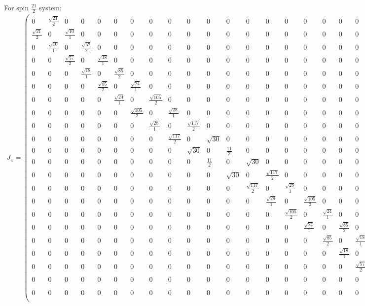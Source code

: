 \documentclass[10pt,a4paper]{article}
\begin{document}
For spin $\frac{21}{2}$ system:\begin{align}
J_x = \begin{pmatrix}
0&\frac{\sqrt{21}}{2}&0&0&0&0&0&0&0&0&0&0&0&0&0&0&0&0&0&0&0&0&\\\frac{\sqrt{21}}{2}&0&\frac{\sqrt{10}}{1}&0&0&0&0&0&0&0&0&0&0&0&0&0&0&0&0&0&0&0&\\0&\frac{\sqrt{10}}{1}&0&\frac{\sqrt{57}}{2}&0&0&0&0&0&0&0&0&0&0&0&0&0&0&0&0&0&0&\\0&0&\frac{\sqrt{57}}{2}&0&\frac{\sqrt{18}}{1}&0&0&0&0&0&0&0&0&0&0&0&0&0&0&0&0&0&\\0&0&0&\frac{\sqrt{18}}{1}&0&\frac{\sqrt{85}}{2}&0&0&0&0&0&0&0&0&0&0&0&0&0&0&0&0&\\0&0&0&0&\frac{\sqrt{85}}{2}&0&\frac{\sqrt{24}}{1}&0&0&0&0&0&0&0&0&0&0&0&0&0&0&0&\\0&0&0&0&0&\frac{\sqrt{24}}{1}&0&\frac{\sqrt{105}}{2}&0&0&0&0&0&0&0&0&0&0&0&0&0&0&\\0&0&0&0&0&0&\frac{\sqrt{105}}{2}&0&\frac{\sqrt{28}}{1}&0&0&0&0&0&0&0&0&0&0&0&0&0&\\0&0&0&0&0&0&0&\frac{\sqrt{28}}{1}&0&\frac{\sqrt{117}}{2}&0&0&0&0&0&0&0&0&0&0&0&0&\\0&0&0&0&0&0&0&0&\frac{\sqrt{117}}{2}&0&\sqrt{30}&0&0&0&0&0&0&0&0&0&0&0&\\0&0&0&0&0&0&0&0&0&\sqrt{30}&0&\frac{11}{2}&0&0&0&0&0&0&0&0&0&0&\\0&0&0&0&0&0&0&0&0&0&\frac{11}{2}&0&\sqrt{30}&0&0&0&0&0&0&0&0&0&\\0&0&0&0&0&0&0&0&0&0&0&\sqrt{30}&0&\frac{\sqrt{117}}{2}&0&0&0&0&0&0&0&0&\\0&0&0&0&0&0&0&0&0&0&0&0&\frac{\sqrt{117}}{2}&0&\frac{\sqrt{28}}{1}&0&0&0&0&0&0&0&\\0&0&0&0&0&0&0&0&0&0&0&0&0&\frac{\sqrt{28}}{1}&0&\frac{\sqrt{105}}{2}&0&0&0&0&0&0&\\0&0&0&0&0&0&0&0&0&0&0&0&0&0&\frac{\sqrt{105}}{2}&0&\frac{\sqrt{24}}{1}&0&0&0&0&0&\\0&0&0&0&0&0&0&0&0&0&0&0&0&0&0&\frac{\sqrt{24}}{1}&0&\frac{\sqrt{85}}{2}&0&0&0&0&\\0&0&0&0&0&0&0&0&0&0&0&0&0&0&0&0&\frac{\sqrt{85}}{2}&0&\frac{\sqrt{18}}{1}&0&0&0&\\0&0&0&0&0&0&0&0&0&0&0&0&0&0&0&0&0&\frac{\sqrt{18}}{1}&0&\frac{\sqrt{57}}{2}&0&0&\\0&0&0&0&0&0&0&0&0&0&0&0&0&0&0&0&0&0&\frac{\sqrt{57}}{2}&0&\frac{\sqrt{10}}{1}&0&\\0&0&0&0&0&0&0&0&0&0&0&0&0&0&0&0&0&0&0&\frac{\sqrt{10}}{1}&0&\frac{\sqrt{21}}{2}&\\0&0&0&0&0&0&0&0&0&0&0&0&0&0&0&0&0&0&0&0&\frac{\sqrt{21}}{2}&0&\\\end{pmatrix}\end{align}
\end{document}
